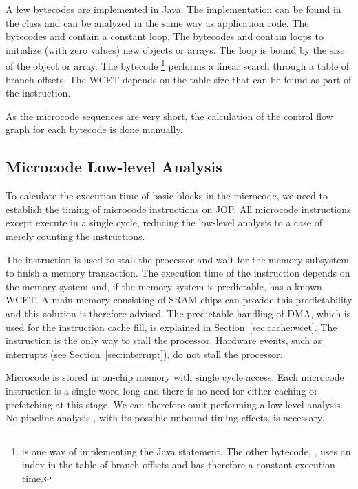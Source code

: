 %
A few bytecodes are implemented in Java. The implementation can be
found in the class  and can be analyzed
in the same way as application code. The bytecodes  and
 contain a constant loop. The bytecodes  and
 contain loops to initialize (with zero values) new
objects or arrays. The loop is bound by the size of the object or
array. The bytecode
\footnote{ is one way of
implementing the Java  statement. The other
bytecode, , uses an index in the table of
branch offsets and has therefore a constant execution time.}
performs a linear search through a table of branch offsets. The WCET
depends on the table size that can be found as part of the
instruction.

As the microcode sequences are very short, the calculation of the
control flow graph for each bytecode is done manually.

\subsection{Microcode Low-level Analysis}

To calculate the execution time of basic blocks in the microcode, we
need to establish the timing of microcode instructions on JOP. All
microcode instructions except  execute in a single cycle,
reducing the low-level analysis to a case of merely counting the
instructions.

The  instruction is used to stall the processor and wait
for the memory subsystem to finish a memory transaction. The
execution time of the  instruction depends on the memory
system and, if the memory system is predictable, has a known WCET. A
main memory consisting of SRAM chips can provide this predictability
and this solution is therefore advised. The predictable handling of
DMA, which is used for the instruction cache fill, is explained in
Section~\ref{sec:cache:wcet}. The  instruction is the
only way to stall the processor. Hardware events, such as interrupts
(see Section~\ref{sec:interrupt}), do not stall the processor.

Microcode is stored in on-chip memory with single cycle access. Each
microcode instruction is a single word long and there is no need for
either caching or prefetching at this stage. We can therefore omit
performing a low-level analysis. No pipeline analysis
\cite{EngblomPhD}, with its possible unbound timing effects, is
necessary.

